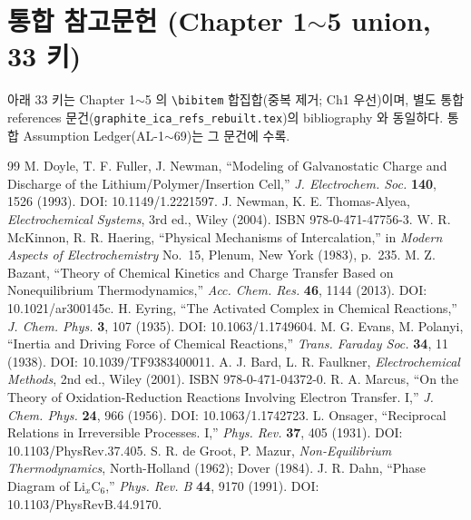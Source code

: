 \clearpage
\section{통합 참고문헌 (Chapter 1$\sim$5 union, 33 키)}\label{sec:full_bib}
아래 33 키는 Chapter 1$\sim$5 의 \texttt{\textbackslash bibitem} 합집합(중복 제거; Ch1 우선)이며, 별도 통합 references 문건(\texttt{graphite\_ica\_refs\_rebuilt.tex})의 bibliography 와 동일하다. 통합 Assumption Ledger(AL-1$\sim$69)는 그 문건에 수록.
\begin{thebibliography}{99}
 M. Doyle, T. F. Fuller, J. Newman, ``Modeling of Galvanostatic Charge and Discharge
  of the Lithium/Polymer/Insertion Cell,'' \emph{J. Electrochem. Soc.} \textbf{140}, 1526 (1993).
  DOI: 10.1149/1.2221597.
 J. Newman, K. E. Thomas-Alyea, \emph{Electrochemical Systems}, 3rd ed., Wiley (2004).
  ISBN 978-0-471-47756-3.
 W. R. McKinnon, R. R. Haering, ``Physical Mechanisms of Intercalation,'' in
  \emph{Modern Aspects of Electrochemistry} No.~15, Plenum, New York (1983), p.~235.
 M. Z. Bazant, ``Theory of Chemical Kinetics and Charge Transfer Based on
  Nonequilibrium Thermodynamics,'' \emph{Acc. Chem. Res.} \textbf{46}, 1144 (2013).
  DOI: 10.1021/ar300145c.
 H. Eyring, ``The Activated Complex in Chemical Reactions,'' \emph{J. Chem. Phys.}
  \textbf{3}, 107 (1935). DOI: 10.1063/1.1749604.
 M. G. Evans, M. Polanyi, ``Inertia and Driving Force of Chemical Reactions,''
  \emph{Trans. Faraday Soc.} \textbf{34}, 11 (1938). DOI: 10.1039/TF9383400011.
 A. J. Bard, L. R. Faulkner, \emph{Electrochemical Methods}, 2nd ed., Wiley (2001).
  ISBN 978-0-471-04372-0.
 R. A. Marcus, ``On the Theory of Oxidation-Reduction Reactions Involving Electron
  Transfer. I,'' \emph{J. Chem. Phys.} \textbf{24}, 966 (1956). DOI: 10.1063/1.1742723.
 L. Onsager, ``Reciprocal Relations in Irreversible Processes. I,'' \emph{Phys. Rev.}
  \textbf{37}, 405 (1931). DOI: 10.1103/PhysRev.37.405.
 S. R. de Groot, P. Mazur, \emph{Non-Equilibrium Thermodynamics},
  North-Holland (1962); Dover (1984).
 J. R. Dahn, ``Phase Diagram of Li$_x$C$_6$,'' \emph{Phys. Rev. B} \textbf{44}, 9170
  (1991). DOI: 10.1103/PhysRevB.44.9170.

\end{thebibliography}
